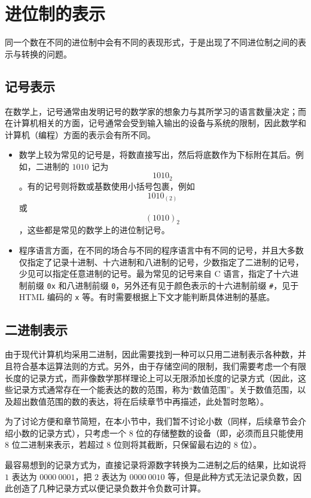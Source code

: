 \section{进位制的表示}\label{sec:NumberSystemBasics/positional-notation-presentation}
    同一个数在不同的进位制中会有不同的表现形式，于是出现了不同进位制之间的表示与转换的问题。
    \subsection{记号表示}\label{subsec:NumberSystemBasics/positional-notation-presentation/natural}
        在数学上，记号通常由发明记号的数学家的想象力与其所学习的语言数量决定；而在计算机相关的方面，记号通常会受到输入输出的设备与系统的限制，因此数学和计算机（编程）方面的表示会有所不同。
        \begin{itemize}
            \item 数学上较为常见的记号是，将数直接写出，然后将底数作为下标附在其后。例如，二进制的 $1010$ 记为\[1010_2\]。有的记号则将数或基数使用小括号包裹，例如\[1010_{(2)}\]或\[(1010)_2\]，这些都是常见的数学上的进位制记号。
            \item 程序语言方面，在不同的场合与不同的程序语言中有不同的记号，并且大多数仅指定了记录十进制、十六进制和八进制的记号，少数指定了二进制的记号，少见可以指定任意进制的记号。最为常见的记号来自 C 语言，指定了十六进制前缀 \texttt{0x} 和八进制前缀 \texttt{0}，另外还有见于颜色表示的十六进制前缀 \texttt{\#}，见于 HTML 编码的 \texttt{x} 等。有时需要根据上下文才能判断具体进制的基底。
        \end{itemize}
    \subsection{二进制表示}\label{subsec:NumberSystemBasics/positional-notation-presentation/binary}
        由于现代计算机均采用二进制，因此需要找到一种可以只用二进制表示各种数，并且符合基本运算法则的方式。另外，由于存储空间的限制，我们需要考虑一个有限长度的记录方式，而非像数学那样理论上可以无限添加长度的记录方式（因此，这些记录方式通常存在一个能表达的数的范围，称为“数值范围”。关于数值范围，以及超出数值范围的数的表达，将在后续章节中再描述，此处暂时忽略）。

        为了讨论方便和章节简短，在本小节中，我们暂不讨论小数（同样，后续章节会介绍小数的记录方式），只考虑一个 $8$ 位的存储整数的设备（即，必须而且只能使用 $8$ 位二进制来表示，若超过 $8$ 位则将其截断，只保留最右边的 $8$ 位）。

        最容易想到的记录方式为，直接记录将源数字转换为二进制之后的结果，比如说将 $1$ 表达为 $0000\ 0001$，把 $2$ 表达为 $0000\ 0010$ 等，但是此种方式无法记录负数，因此创造了几种记录方式以便记录负数并令负数可计算。

